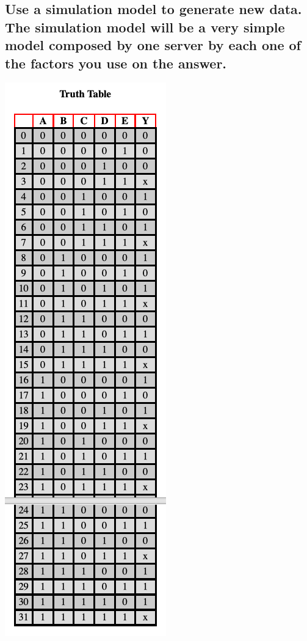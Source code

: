 \documentclass[12pt]{article}
\begin{document}
\subsection {Use a simulation model to generate new data. The simulation model will be a very simple model composed by one server by each one of the factors you use on the answer.}
\noindent\begin{minipage}{0.3\textwidth}%
  \includegraphics[scale=0.4]{scenariosFullFactor.png}
\end{minipage}%
\end{document}
